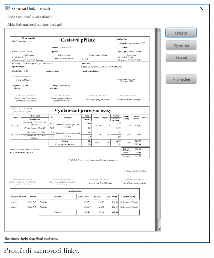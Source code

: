 \documentclass[
  master,
  field=ainfp,
  biblatex,
  language=czech,
  glossaries,
  theorems=false,
  index
]{kidiplom}
\begin{document}
\newpage
\begin{figure}[h]
  \centerline{\includegraphics[width=1\linewidth]{./images/ScanLine2.png}} 
  \caption{Prostředí skenovací linky.} 
\end{figure}

\newpage
\end{document}
